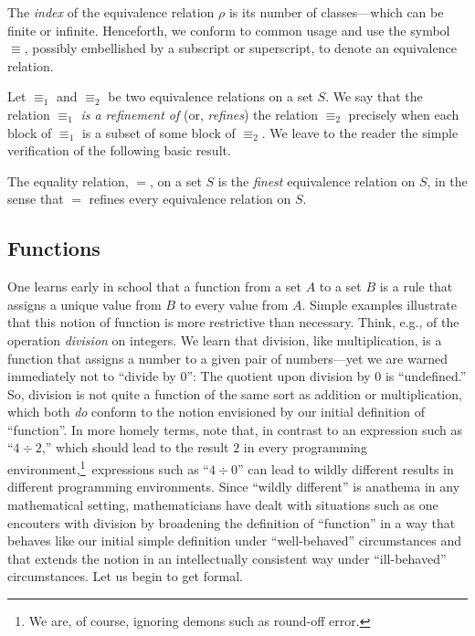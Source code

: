 The {\it index} 
  of the equivalence relation $\rho$ is its number of
classes---which can be finite or infinite.  Henceforth, we conform to
common usage and use the symbol $\equiv$, possibly embellished by a
subscript or superscript, to denote an equivalence relation.

Let $\equiv_1$ and $\equiv_2$ be two equivalence relations on a set
$S$.  We say that the relation $\equiv_1$ {\em is a refinement of}
(or, {\em refines}) 
the relation $\equiv_2$ precisely when each block of $\equiv_1$ is a
subset of some block of $\equiv_2$.  We leave to the reader the simple
verification of the following basic result.


\begin{theorem}
\label{thm:equality=finest-equiv}
The equality relation, $=$, on a set $S$ is the {\em finest}
equivalence relation on $S$, in the sense that $=$ refines every
equivalence relation on $S$.
\end{theorem}

\subsection{Functions}
\label{sec:function}

One learns early in school that a function from a set $A$ to a set $B$
is a rule that assigns a unique value from $B$ to every value from
$A$.  Simple examples illustrate that this notion of function is more
restrictive than necessary.  Think, e.g., of the operation {\em
  division} on integers.  We learn that division, like multiplication,
is a function that assigns a number to a given pair of numbers---yet
we are warned immediately not to ``divide by $0$'': The quotient upon
division by $0$ is ``undefined.''  So, division is not quite a
function of the same sort as addition or multiplication, which both
{\em do} conform to the notion envisioned by our initial definition of
``function''.  In more homely terms, note that, in contrast to an
expression such as ``$4 \div 2$,'' which should lead to the result $2$
in every programming environment,\footnote{We are, of course, ignoring
  demons such as round-off error.}~expressions such as ``$4 \div 0$''
can lead to wildly different results in different programming
environments.  Since ``wildly different'' is anathema in any
mathematical setting, mathematicians have dealt with situations such
as one encouters with division by broadening the definition of
``function'' in a way that behaves like our initial simple definition
under ``well-behaved'' circumstances and that extends the notion in an
intellectually consistent way under ``ill-behaved'' circumstances.
Let us begin to get formal.

